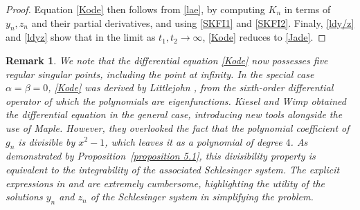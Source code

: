 \documentclass[10pt, reqno]{amsart}
\numberwithin{equation}{section}
\newtheorem{remark}{Remark}[section]
\numberwithin{equation}{section}
\begin{document}
\begin{proof}
Equation \eqref{Kode} then follows from \eqref{lae}, by computing $K_n$ in terms of $y_n,z_n$ and their partial derivatives, and using \eqref{SKFI1} and \eqref{SKFI2}. Finaly, \eqref{ldy/z} and \eqref{ldyz} show that in the limit as $t_1,t_2\to \infty$, \eqref{Kode} reduces to \eqref{Jade}.
\end{proof}
\begin{remark} \label{remark 5.1}
\emph{We note that the differential equation \eqref{Kode} now possesses five regular singular points, including the point at infinity. In the special case  $\alpha=\beta=0$, \eqref{Kode} was derived by Littlejohn \cite{LLL2}, from the sixth-order differential operator of which the polynomials are eigenfunctions. Kiesel and Wimp \cite{KW} obtained the differential equation in the general case, introducing new tools alongside the use of Maple. However, they overlooked the fact that the polynomial coefficient of $g_n$ is divisible by $x^2-1$, which leaves it as a polynomial of degree $4$. As demonstrated by Proposition~\ref{proposition 5.1}, this divisibility property is equivalent to the integrability of the associated Schlesinger system. The explicit expressions in \cite{LLL2} and \cite{KW} are extremely cumbersome, highlighting the utility of the solutions $y_n$ and $z_n$ of the Schlesinger system in simplifying the problem.}
\end{remark}
\end{document}
